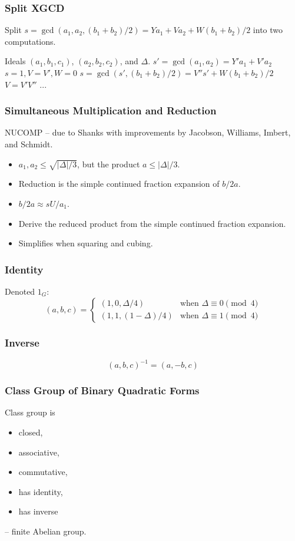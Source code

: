 \documentclass{beamer}
\begin{document}
\begin{frame}
\frametitle{Split XGCD}

Split $s = \gcd(a_1, a_2, (b_1+b_2)/2) = Ya_1 + Va_2 + W(b_1+b_2)/2$ into two computations.
\bigbreak

\begin{algorithmic}[1]
\Require Ideals $(a_1, b_1, c_1)$, $(a_2, b_2, c_2)$, and $\Delta$.
\State $s' = \gcd(a_1, a_2) = Y'a_1 + V'a_2$ 
\State $s = 1, V = V', W = 0$
\Else
\State $s = \gcd(s', (b_1 + b_2)/2) = V''s' + W(b_1 + b_2)/2$
\State $V = V'V''$ 
\EndIf
\State ...
\end{algorithmic}
\end{frame}

\begin{frame}
\frametitle{Simultaneous Multiplication and Reduction}
NUCOMP -- due to Shanks with improvements by Jacobson, Williams, Imbert, and Schmidt.
\begin{itemize}[<+->]
\item $a_1, a_2 \le \sqrt{|\Delta|/3}$, but the product $a \le |\Delta|/3$.
\item Reduction is the simple continued fraction expansion of $b/2a$.
\item $b/2a \approx sU/a_1$.
\item Derive the reduced product from the simple continued fraction expansion.
\item Simplifies when squaring and cubing.
\end{itemize}
\end{frame}

\begin{frame}
\frametitle{Identity}
Denoted $1_G$:
\[
(a, b, c) = \begin{cases}
  (1, 0, \Delta/4) & \textrm{when } \Delta \equiv 0 \pmod 4 \\
  (1, 1, (1-\Delta)/4) & \textrm{when } \Delta \equiv 1 \pmod 4
\end{cases}
\]
\end{frame}

\begin{frame}
\frametitle{Inverse}
\[
(a, b, c)^{-1} = (a, -b, c)
\]
\end{frame}

\begin{frame}
\frametitle{Class Group of Binary Quadratic Forms}
Class group is 
\begin{itemize}
\item closed,
\item associative,
\item commutative,
\item has identity,
\item has inverse
\end{itemize}
 -- finite Abelian group.
\end{frame}
\end{document}
